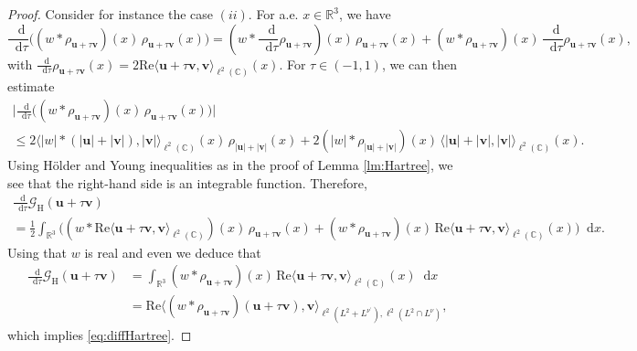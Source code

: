 \documentclass[12pt,a4paper]{amsart}
\numberwithin{equation}{section}
\newcommand{\ulu}{\boldsymbol{u}}
\newcommand{\ulv}{\boldsymbol{v}}
\newcommand*\diff{\mathop{}\!\mathrm{d}}
\begin{document}
	\begin{proof}
		Consider for instance the case $(ii)$. For a.e. $x\in\mathbb{R}^3$, we have
		\begin{equation*}
			\frac{\diff}{\diff \tau} \big( (w \ast \rho_{\ulu + \tau \ulv} )(x) \, \rho_{\ulu + \tau \ulv}(x) \big)
			= (w \ast \frac{\diff}{\diff \tau} \rho_{\ulu + \tau \ulv} )(x)  \, \rho_{\ulu + \tau \ulv}(x) + (w \ast \rho_{\ulu +\tau \ulv } )(x)  \, \frac{\diff}{\diff \tau} \rho_{\ulu + \tau \ulv} (x) ,
		\end{equation*}
		with $ \frac{\diff}{\diff \tau} \rho_{\ulu + \tau \ulv} (x) = 2 \mathrm{Re} \langle {\ulu} + \tau {\ulv} , \ulv\rangle_{\ell^2(\mathbb{C})} (x) $. For $\tau\in(-1,1)$, we can then estimate
		\begin{multline*}
			\Big|\frac{\diff}{\diff \tau} \big( (w \ast \rho_{\ulu + \tau \ulv} )(x)  \, \rho_{\ulu + \tau \ulv}(x) \big)\Big|\\
			\le 2\langle|w| \ast ( |\ulu| + |\ulv|) , |\ulv| \rangle_{\ell^2(\mathbb{C})} (x)  \, \rho_{|\ulu| + |\ulv|}(x) + 2(|w| \ast \rho_{|\ulu| + |\ulv| } )(x)  \, \langle |\ulu| + |\ulv| , |\ulv| \rangle_{\ell^2(\mathbb{C})} (x) .
		\end{multline*}
		Using Hölder and Young inequalities as in the proof of Lemma \ref{lm:Hartree}, we see that the right-hand side is an integrable function.
		Therefore,
		\begin{multline*}
			\frac{\diff}{\diff \tau} \mathscr{G}_{\mathrm{H}}(\ulu + \tau \ulv) \\
			= \frac{1}{2} \int_{\mathbb{R}^3} \big( (w \ast \mathrm{Re} \langle {\ulu} + \tau {\ulv} , \ulv \rangle_{\ell^2(\mathbb{C})} ) (x)  \, \rho_{\ulu + \tau \ulv}(x) + (w \ast \rho_{\ulu +\tau \ulv } )(x)  \, \mathrm{Re} \langle {\ulu} + \tau {\ulv} , \ulv\rangle_{\ell^2(\mathbb{C})} (x) \big) \diff x .
		\end{multline*}
		Using that $w$ is real and even we deduce that
		\begin{align*}
			\frac{\diff}{\diff \tau} \mathscr{G}_{\mathrm{H}}(\ulu + \tau \ulv)  &=  \int_{\mathbb{R}^3} (w \ast \rho_{\ulu +\tau \ulv } )(x)   \, \mathrm{Re} \langle {\ulu} + \tau {\ulv} , \ulv\rangle_{\ell^2(\mathbb{C})} (x) \diff x \\
			& = \mathrm{Re} \langle (w \ast \rho_{\ulu +\tau \ulv } ) ( \ulu +\tau \ulv) , \ulv \rangle_{\ell^2(L^2+L^{\nu^\prime}),\ell^2(L^2\cap L^{\nu})} ,
		\end{align*}
		which implies \eqref{eq:diffHartree}.
	\end{proof}
	
\end{document}
